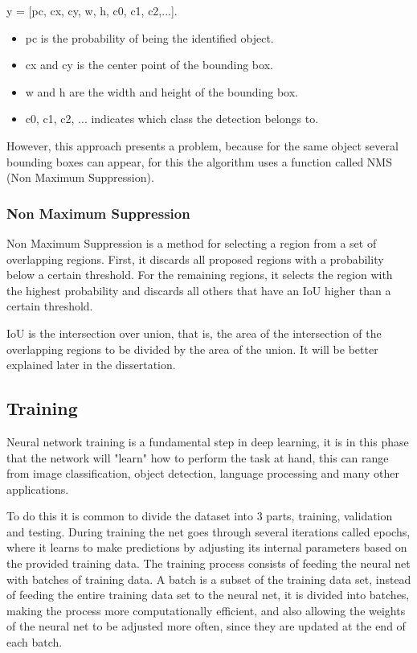 y = [pc, cx, cy, w, h, c0, c1, c2,...].

\begin{itemize}
    \item pc is the probability of being the identified object.
    \item cx and cy is the center point of the bounding box.
    \item w and h are the width and height of the bounding box.
    \item c0, c1, c2, ... indicates which class the detection belongs to.
\end{itemize}

However, this approach presents a problem, because for the same object several bounding boxes can appear, for this the algorithm uses a function called NMS (Non Maximum Suppression).

\subsubsection{Non Maximum Suppression}
Non Maximum Suppression \cite{nonmaxsurpression} is a method for selecting a region from a set of overlapping regions. First, it discards all proposed regions with a probability below a certain threshold. For the remaining regions, it selects the region with the highest probability and discards all others that have an IoU higher than a certain threshold.

IoU is the intersection over union, that is, the area of the intersection of the overlapping regions to be divided by the area of the union. It will be better explained later in the dissertation.



\subsection{Training}
Neural network training is a fundamental step in deep learning, it is in this phase that the network will "learn" how to perform the task at hand, this can range from image classification, object detection, language processing and many other applications.

To do this it is common to divide the dataset into 3 parts, training, validation and testing. During training the net goes through several iterations called epochs, where it learns to make predictions by adjusting its internal parameters based on the provided training data.
The training process consists of feeding the neural net with batches of training data.
A batch is a subset of the training data set, instead of feeding the entire training data set to the neural net, it is divided into batches, making the process more computationally efficient, and also allowing the weights of the neural net to be adjusted more often, since they are updated at the end of each batch.

